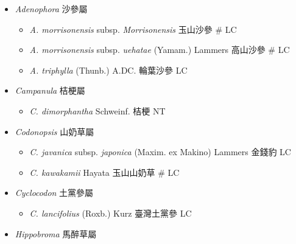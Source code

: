 
  \begin{itemize}
 \item[] \textit{Adenophora} 沙參屬
                                
  \begin{itemize}
        \item[] \textit{A. morrisonensis} subsp. \textit{Morrisonensis}   玉山沙參  \# LC
        \item[] \textit{A. morrisonensis} subsp. \textit{uehatae} (Yamam.) Lammers  高山沙參  \# LC
        \item[] \textit{A. triphylla} (Thunb.) A.DC.  輪葉沙參   LC
  \end{itemize}
 \item[] \textit{Campanula} 桔梗屬
                                
  \begin{itemize}
        \item[] \textit{C. dimorphantha} Schweinf.  桔梗   NT
  \end{itemize}
 \item[] \textit{Codonopsis} 山奶草屬
                                
  \begin{itemize}
        \item[] \textit{C. javanica} subsp. \textit{japonica} (Maxim. ex Makino) Lammers  金錢豹   LC
        \item[] \textit{C. kawakamii} Hayata  玉山山奶草  \# LC
  \end{itemize}
 \item[] \textit{Cyclocodon} 土黨參屬
                                
  \begin{itemize}
        \item[] \textit{C. lancifolius} (Roxb.) Kurz  臺灣土黨參   LC
  \end{itemize}
 \item[] \textit{Hippobroma} 馬醉草屬
                                

\end{itemize}
